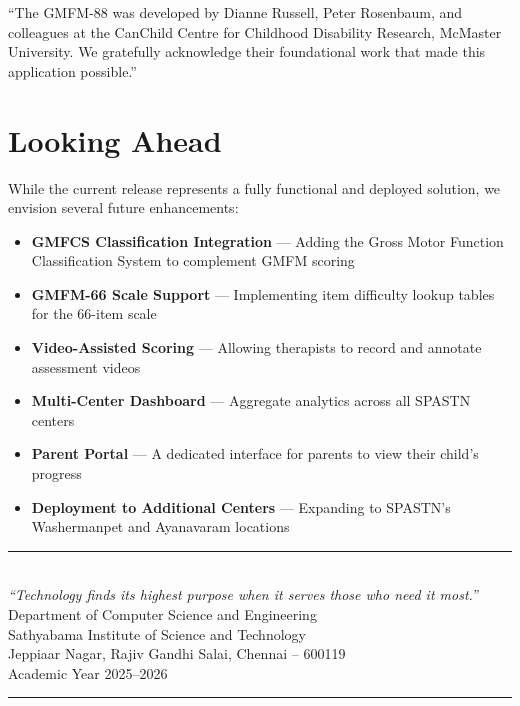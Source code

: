 \documentclass[11pt,a4paper]{article}
\begin{document}
\vspace{0.5cm}

\begin{quotecallout}
``The GMFM-88 was developed by Dianne Russell, Peter Rosenbaum, and colleagues at the CanChild Centre for Childhood Disability Research, McMaster University. We gratefully acknowledge their foundational work that made this application possible.''
\end{quotecallout}

\section{Looking Ahead}

While the current release represents a fully functional and deployed solution, we envision several future enhancements:

\begin{itemize}[leftmargin=2em, itemsep=3pt]
    \item \textbf{GMFCS Classification Integration} --- Adding the Gross Motor Function Classification System to complement GMFM scoring
    \item \textbf{GMFM-66 Scale Support} --- Implementing item difficulty lookup tables for the 66-item scale
    \item \textbf{Video-Assisted Scoring} --- Allowing therapists to record and annotate assessment videos
    \item \textbf{Multi-Center Dashboard} --- Aggregate analytics across all SPASTN centers
    \item \textbf{Parent Portal} --- A dedicated interface for parents to view their child's progress
    \item \textbf{Deployment to Additional Centers} --- Expanding to SPASTN's Washermanpet and Ayanavaram locations
\end{itemize}

\vspace{1cm}


\begin{center}
{\color{sathyamaruby}\rule{0.3\textwidth}{1pt}}\\[0.5cm]
{\large\color{deepnavy}\textit{``Technology finds its highest purpose when it serves those who need it most.''}}\\[0.8cm]

{\small\color{warmgray} Department of Computer Science and Engineering}\\
{\small\color{warmgray} Sathyabama Institute of Science and Technology}\\
{\small\color{warmgray} Jeppiaar Nagar, Rajiv Gandhi Salai, Chennai -- 600119}\\[0.3cm]
{\small\color{warmgray} Academic Year 2025--2026}\\[0.5cm]
{\color{sathyamaruby}\rule{0.3\textwidth}{1pt}}
\end{center}

\end{document}
